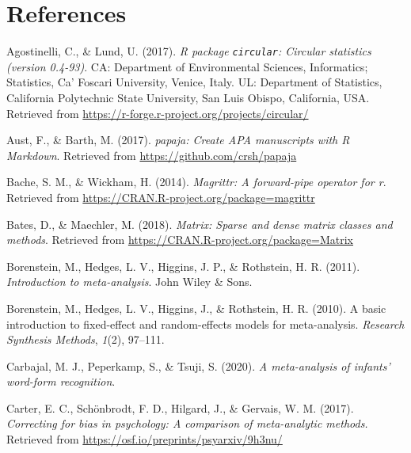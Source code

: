 \documentclass[english,,man]{apa6}
\begin{document}
\newpage

\hypertarget{references}{%
\section{References}\label{references}}

\begingroup
\setlength{\parindent}{-0.5in}
\setlength{\leftskip}{0.5in}

\hypertarget{refs}{}
\leavevmode\hypertarget{ref-R-circular}{}%
Agostinelli, C., \& Lund, U. (2017). \emph{R package \texttt{circular}: Circular statistics (version 0.4-93)}. CA: Department of Environmental Sciences, Informatics; Statistics, Ca' Foscari University, Venice, Italy. UL: Department of Statistics, California Polytechnic State University, San Luis Obispo, California, USA. Retrieved from \url{https://r-forge.r-project.org/projects/circular/}

\leavevmode\hypertarget{ref-R-papaja}{}%
Aust, F., \& Barth, M. (2017). \emph{papaja: Create APA manuscripts with R Markdown}. Retrieved from \url{https://github.com/crsh/papaja}

\leavevmode\hypertarget{ref-R-magrittr}{}%
Bache, S. M., \& Wickham, H. (2014). \emph{Magrittr: A forward-pipe operator for r}. Retrieved from \url{https://CRAN.R-project.org/package=magrittr}

\leavevmode\hypertarget{ref-R-Matrix}{}%
Bates, D., \& Maechler, M. (2018). \emph{Matrix: Sparse and dense matrix classes and methods}. Retrieved from \url{https://CRAN.R-project.org/package=Matrix}

\leavevmode\hypertarget{ref-Borenstein:etal:2011}{}%
Borenstein, M., Hedges, L. V., Higgins, J. P., \& Rothstein, H. R. (2011). \emph{Introduction to meta-analysis}. John Wiley \& Sons.

\leavevmode\hypertarget{ref-Borenstein:etal:2010}{}%
Borenstein, M., Hedges, L. V., Higgins, J., \& Rothstein, H. R. (2010). A basic introduction to fixed-effect and random-effects models for meta-analysis. \emph{Research Synthesis Methods}, \emph{1}(2), 97--111.

\leavevmode\hypertarget{ref-Carbajal:etal:2020}{}%
Carbajal, M. J., Peperkamp, S., \& Tsuji, S. (2020). \emph{A meta-analysis of infants' word-form recognition}.

\leavevmode\hypertarget{ref-Carter:etal:2017}{}%
Carter, E. C., Schönbrodt, F. D., Hilgard, J., \& Gervais, W. M. (2017). \emph{Correcting for bias in psychology: A comparison of meta-analytic methods.} Retrieved from \url{https://osf.io/preprints/psyarxiv/9h3nu/}
\end{document}
